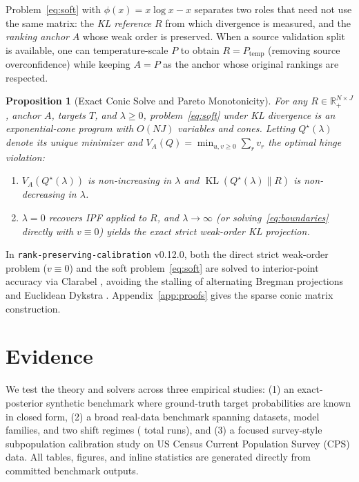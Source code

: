 \documentclass[11pt]{article}
\newtheorem{proposition}{Proposition}
\begin{document}
Problem~\eqref{eq:soft} with $\phi(x) = x\log x - x$ separates two roles that need not use the same matrix: the \emph{KL reference} $R$ from which divergence is measured, and the \emph{ranking anchor} $A$ whose weak order is preserved. When a source validation split is available, one can temperature-scale $P$ to obtain $R = P_{\mathrm{temp}}$ (removing source overconfidence) while keeping $A = P$ as the anchor whose original rankings are respected.

\begin{proposition}[Exact Conic Solve and Pareto Monotonicity]
\label{prop:pareto}
For any $R \in \mathbb{R}_+^{N \times J}$, anchor $A$, targets $T$, and $\lambda \ge 0$, problem~\eqref{eq:soft} under KL divergence is an exponential-cone program with $O(NJ)$ variables and cones. Letting $Q^\star(\lambda)$ denote its unique minimizer and $V_A(Q) = \min_{u,v \ge 0} \sum_r v_r$ the optimal hinge violation:
\begin{enumerate}[label=(\alph*),leftmargin=*,itemsep=2pt]
\item $V_A(Q^\star(\lambda))$ is non-increasing in $\lambda$ and $\operatorname{KL}(Q^\star(\lambda) \| R)$ is non-decreasing in $\lambda$.
\item $\lambda = 0$ recovers IPF applied to $R$, and $\lambda \to \infty$ (or solving~\eqref{eq:boundaries} directly with $v \equiv 0$) yields the exact strict weak-order KL projection.
\end{enumerate}
\end{proposition}

In \texttt{rank-preserving-calibration} v0.12.0, both the direct strict weak-order problem ($v \equiv 0$) and the soft problem~\eqref{eq:soft} are solved to interior-point accuracy via Clarabel \citep{goulart2024clarabel}, avoiding the stalling of alternating Bregman projections \citep{bauschke2000} and Euclidean Dykstra \citep{dykstra1983,duchi2008,condat2016}. Appendix~\ref{app:proofs} gives the sparse conic matrix construction.

\section{Evidence}

We test the theory and solvers across three empirical studies: (1) an exact-posterior synthetic benchmark where ground-truth target probabilities are known in closed form, (2) a broad real-data benchmark spanning \NumDatasets{} datasets, \NumModels{} model families, and two shift regimes (\NumTotalRealRuns{} total runs), and (3) a focused survey-style subpopulation calibration study on US Census Current Population Survey (CPS) data. All tables, figures, and inline statistics are generated directly from committed benchmark outputs.
\end{document}
